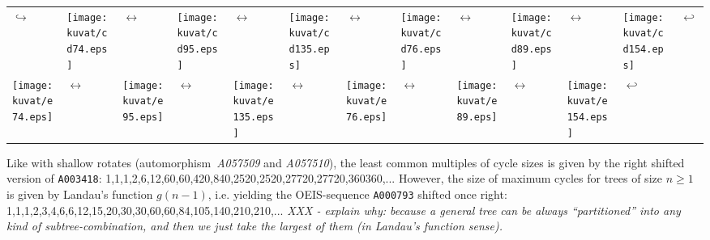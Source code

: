 \documentclass[11pt]{article} %
\newcommand{\autname}[1]{{\it *#1}}
\newcommand{\automorphism}[1]{automorphism~\autname{#1}}
\newcommand{\EISseq}[1]{{\tt #1}}
\begin{document}
\begin{center}
\begin{tabular}{>{\small}p{0.07cm} p{0.4cm}
                >{\small}p{0.07cm} p{0.4cm}
                >{\small}p{0.07cm} p{0.4cm}
                >{\small}p{0.07cm} p{0.4cm}
                >{\small}p{0.07cm} p{0.4cm}
                >{\small}p{0.07cm} p{0.4cm}
                >{\small}p{0.07cm}}
$\hookrightarrow$&
\texttt{[image: kuvat/cd74.eps]} &$\leftrightarrow$&
\texttt{[image: kuvat/cd95.eps]} &$\leftrightarrow$&
\texttt{[image: kuvat/cd135.eps]} &$\leftrightarrow$&
\texttt{[image: kuvat/cd76.eps]} &$\leftrightarrow$&
\texttt{[image: kuvat/cd89.eps]} &$\leftrightarrow$&
\texttt{[image: kuvat/cd154.eps]} &$\hookleftarrow$ \\

 \texttt{[image: kuvat/e74.eps]} &$\leftrightarrow$&
 \texttt{[image: kuvat/e95.eps]} &$\leftrightarrow$&
 \texttt{[image: kuvat/e135.eps]} &$\leftrightarrow$&
 \texttt{[image: kuvat/e76.eps]} &$\leftrightarrow$&
 \texttt{[image: kuvat/e89.eps]} &$\leftrightarrow$&
 \texttt{[image: kuvat/e154.eps]} &$\hookleftarrow$ \\

\end{tabular}
\end{center}


Like with shallow rotates (\automorphism{A057509} and \autname{A057510}),
the least common multiples of cycle sizes is given by the right shifted
version of \EISseq{A003418}:
1,1,1,2,6,12,60,60,420,840,2520,2520,27720,27720,360360,...
However, the size of maximum cycles for trees of size $n{\ge}1$
is given by Landau's function $g(n-1)$,
i.e. yielding the OEIS-sequence \EISseq{A000793} shifted once right:
1,1,1,2,3,4,6,6,12,15,20,30,30,60,60,84,105,140,210,210,...
{\em XXX - explain why: because a general tree can be always
  ``partitioned'' into any kind of subtree-combination,
   and then we just take the largest of them (in Landau's function sense).}


\
\end{document}
